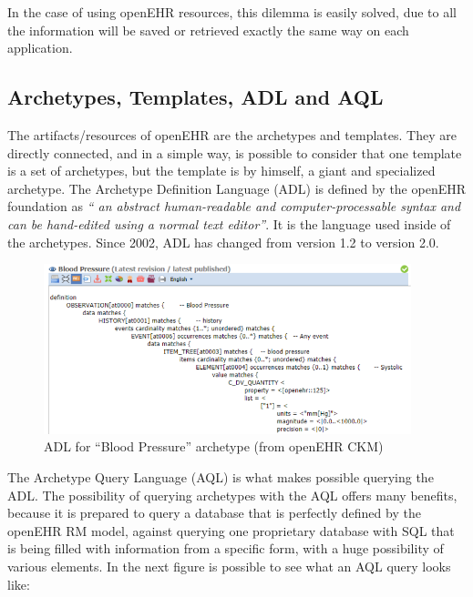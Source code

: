 \documentclass[mim_thesis.tex]{subfiles}
\begin{document}
In the case of using openEHR resources, this dilemma is easily solved, due to all the information will be saved or retrieved exactly the same way on each application.

\subsection{Archetypes, Templates, ADL and AQL}
The artifacts/resources of openEHR are the archetypes and templates. They are directly connected, and in a simple way, is possible to consider that one template is a set of archetypes, but the template is by himself, a giant and specialized archetype. The Archetype Definition Language (ADL) is defined by the openEHR foundation as \textit{“ an abstract human-readable and computer-processable syntax and can be hand-edited using a normal text editor”}. It is the language used inside of the archetypes. Since 2002, ADL has changed from version 1.2 to version 2.0.\\

\begin{figure}[H]
	\centering
    \includegraphics[width=0.95\textwidth]{img/bp_adl.PNG}
	\caption{ADL for “Blood Pressure” archetype (from openEHR CKM)}
	\label{fig:bp_adl}
\end{figure}

The Archetype Query Language (AQL) is what makes possible querying the ADL. The possibility of querying archetypes with the AQL offers many benefits, because it is prepared to query a database that is perfectly defined by the openEHR RM model, against querying one proprietary database with \ac{SQL} that is being filled with information from a specific form, with a huge possibility of various elements. In the next figure is possible to see what an AQL query looks like: \\
\end{document}
